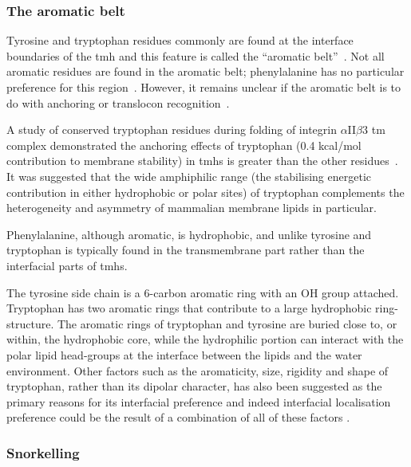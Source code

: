 \subsubsection{The aromatic belt}

Tyrosine and tryptophan residues commonly are found at the interface boundaries of the \gls{tmh} and this feature is called the ``aromatic belt''~\cite{Hessa2005, Granseth2005, Sharpe2010, Baeza-Delgado2013, Nilsson2005a}.
Not all aromatic residues are found in the aromatic belt; phenylalanine has no particular preference for this region~\cite{Granseth2005, Braun1999}.
However, it remains unclear if the aromatic belt is to do with anchoring or translocon recognition~\cite{Baeza-Delgado2013}.

A study of conserved tryptophan residues during folding of integrin $\alpha$II$\beta$3 \gls{tm} complex demonstrated the anchoring effects of tryptophan (0.4 kcal/mol contribution to membrane stability) in \gls{tmh}s is greater than the other residues~\cite{Situ2018}. It was suggested that the wide amphiphilic range (the stabilising energetic contribution in either hydrophobic or polar sites) of tryptophan complements the heterogeneity and asymmetry of mammalian membrane lipids in particular.

Phenylalanine, although aromatic, is hydrophobic, and unlike tyrosine and tryptophan is typically found in the transmembrane part rather than the interfacial parts of \gls{tmh}s.

The tyrosine side chain is a 6\--carbon aromatic ring with an OH group attached.
Tryptophan has two aromatic rings that contribute to a large hydrophobic ring-structure.
The aromatic rings of tryptophan and tyrosine are buried close to, or within, the hydrophobic core, while the hydrophilic portion can interact with the polar lipid head\--groups at the interface between the lipids and the water environment.
Other factors such as the aromaticity, size, rigidity and shape of tryptophan, rather than its dipolar character, has also been suggested as the primary reasons for its interfacial preference and indeed interfacial localisation preference could be the result of a combination of all of these factors \cite{Yau1998}.


\subsubsection{Snorkelling}

